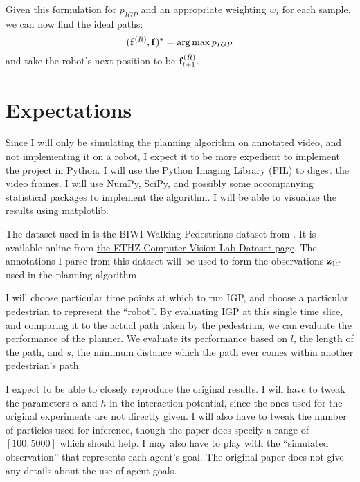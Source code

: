 \documentclass[a4paper,11pt,headings=small]{article}
\DeclareMathOperator*{\argmax}{arg\,max}
\begin{document}
Given this formulation for $p_{IGP}$ and an appropriate weighting $w_i$ for each sample, we can now find the ideal paths:
$$ (\fr,\f)^* = \argmax p_{IGP} $$
and take the robot's next position to be $\mathbf{f}^{(R)}_{t+1}$.

\section*{Expectations}
\quad Since I will only be simulating the planning algorithm on annotated video, and not implementing it on a robot, I expect it to be more expedient to implement the project in Python. I will use the Python Imaging Library (PIL) to digest the video frames. I will use NumPy, SciPy, and possibly some accompanying statistical packages to implement the algorithm. I will be able to visualize the results using matplotlib.

The dataset used in \cite{Trautman2010} is the BIWI Walking Pedestrians dataset from \cite{Pellegrini2009}. It is available online from \href{http://www.vision.ee.ethz.ch/datasets/index.en.html}{the ETHZ Computer Vision Lab Dataset page}. The annotations I parse from this dataset will be used to form the observations $\mathbf{z}_{1:t}$ used in the planning algorithm.

I will choose particular time points at which to run IGP, and choose a particular pedestrian to represent the ``robot''. By evaluating IGP at this single time slice, and comparing it to the actual path taken by the pedestrian, we can evaluate the performance of the planner. We evaluate its performance based on $l$, the length of the path, and $s$, the minimum distance which the path ever comes within another pedestrian's path.

I expect to be able to closely reproduce the original results. I will have to tweak the parameters $\alpha$ and $h$ in the interaction potential, since the ones used for the original experiments are not directly given. I will also have to tweak the number of particles used for inference, though the paper does specify a range of $[100,5000]$ which should help. I may also have to play with the ``simulated observation'' that represents each agent's goal. The original paper does not give any details about the use of agent goals.




\end{document}
